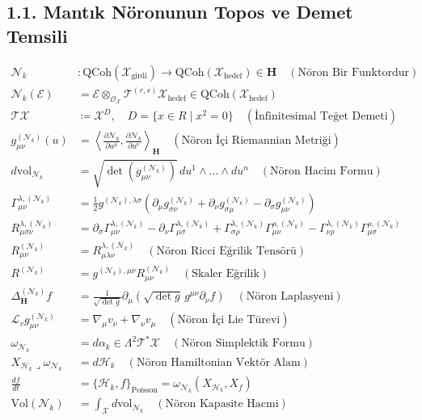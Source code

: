 \documentclass[11pt, a4paper]{article}
\begin{document}
\subsection{1.1. Mantık Nöronunun Topos ve Demet Temsili}
\begin{align}
\mathcal{N}_k &: \text{QCoh}(\mathcal{X}_{\text{girdi}}) \longrightarrow \text{QCoh}(\mathcal{X}_{\text{hedef}}) \in \mathbf{H} \quad (\text{Nöron Bir Funktordur}) \\
\mathcal{N}_k(\mathcal{E}) &= \mathcal{E} \otimes_{\mathcal{O}_{\mathcal{X}}} \mathcal{T}^{(r,s)} \mathcal{X}_{\text{hedef}} \in \text{QCoh}(\mathcal{X}_{\text{hedef}}) \\
\mathcal{T}\mathcal{X} &\coloneqq \mathcal{X}^D, \quad D = \{x \in R \mid x^2 = 0\} \quad (\text{İnfinitesimal Teğet Demeti}) \\
g_{\mu\nu}^{(\mathcal{N}_k)}(u) &= \left\langle \frac{\partial \mathcal{N}_k}{\partial u^\mu}, \frac{\partial \mathcal{N}_k}{\partial u^\nu} \right\rangle_{\mathbf{H}} \quad (\text{Nöron İçi Riemannian Metriği}) \\
d\text{vol}_{\mathcal{N}_k} &= \sqrt{\det(g_{\mu\nu}^{(\mathcal{N}_k)})} \, du^1 \wedge \dots \wedge du^n \quad (\text{Nöron Hacim Formu}) \\
\Gamma_{\mu\nu}^{\lambda, (\mathcal{N}_k)} &= \frac{1}{2} g^{(\mathcal{N}_k), \lambda \sigma} \left( \partial_\mu g_{\sigma\nu}^{(\mathcal{N}_k)} + \partial_\nu g_{\sigma\mu}^{(\mathcal{N}_k)} - \partial_\sigma g_{\mu\nu}^{(\mathcal{N}_k)} \right) \\
R_{\mu\sigma\nu}^{\lambda, (\mathcal{N}_k)} &= \partial_\sigma \Gamma_{\mu\nu}^{\lambda, (\mathcal{N}_k)} - \partial_\nu \Gamma_{\mu\sigma}^{\lambda, (\mathcal{N}_k)} + \Gamma_{\sigma\rho}^{\lambda, (\mathcal{N}_k)} \Gamma_{\mu\nu}^{\rho, (\mathcal{N}_k)} - \Gamma_{\nu\rho}^{\lambda, (\mathcal{N}_k)} \Gamma_{\mu\sigma}^{\rho, (\mathcal{N}_k)} \\
R_{\mu\nu}^{(\mathcal{N}_k)} &= R_{\mu\lambda\nu}^{\lambda, (\mathcal{N}_k)} \quad (\text{Nöron Ricci Eğrilik Tensörü}) \\
R^{(\mathcal{N}_k)} &= g^{(\mathcal{N}_k), \mu\nu} R_{\mu\nu}^{(\mathcal{N}_k)} \quad (\text{Skaler Eğrilik}) \\
\Delta_{\mathbf{H}}^{(\mathcal{N}_k)} f &= \frac{1}{\sqrt{\det g}} \partial_\mu \left( \sqrt{\det g} \, g^{\mu\nu} \partial_\nu f \right) \quad (\text{Nöron Laplasyeni}) \\
\mathcal{L}_v g_{\mu\nu}^{(\mathcal{N}_k)} &= \nabla_\mu v_\nu + \nabla_\nu v_\mu \quad (\text{Nöron İçi Lie Türevi}) \\
\omega_{\mathcal{N}_k} &= d\alpha_k \in \Lambda^2 \mathcal{T}^*\mathcal{X} \quad (\text{Nöron Simplektik Formu}) \\
X_{\mathcal{H}_k} \mathbin{\lrcorner} \omega_{\mathcal{N}_k} &= d\mathcal{H}_k \quad (\text{Nöron Hamiltonian Vektör Alanı}) \\
\frac{df}{dt} &= \{\mathcal{H}_k, f\}_{\text{Poisson}} = \omega_{\mathcal{N}_k}(X_{\mathcal{H}_k}, X_f) \\
\text{Vol}(\mathcal{N}_k) &= \int_{\mathcal{X}} d\text{vol}_{\mathcal{N}_k} \quad (\text{Nöron Kapasite Hacmi})
\end{align}
\end{document}

